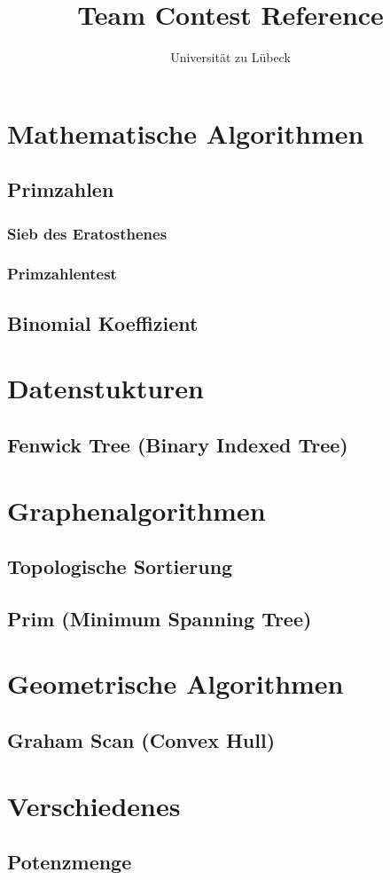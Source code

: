 \documentclass[10pt,a4paper,ngerman]{article}
\title{Team Contest Reference}
\author{Universität zu Lübeck}
\begin{document}
\lstset{basicstyle=\ttfamily\footnotesize,numbers=left,numberstyle=\tiny,tabsize=2,numbersep=5pt}
\maketitle

\section{Mathematische Algorithmen}
\subsection{Primzahlen}
\subsubsection{Sieb des Eratosthenes}

\subsubsection{Primzahlentest}

\subsection{Binomial Koeffizient}


\section{Datenstukturen}
\subsection{Fenwick Tree (Binary Indexed Tree)}


\section{Graphenalgorithmen}
\subsection{Topologische Sortierung}

\subsection{Prim (Minimum Spanning Tree)}


\section{Geometrische Algorithmen}
\subsection{Graham Scan (Convex Hull)}


\section{Verschiedenes}
\subsection{Potenzmenge}

\end{document}
